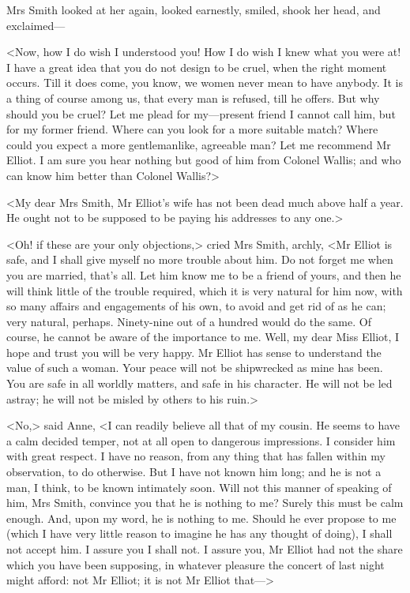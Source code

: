 Mrs Smith looked at her again, looked earnestly, smiled, shook her head, and exclaimed—

<Now, how I do wish I understood you! How I do wish I knew what you were at! I have a great idea that you do not design to be cruel, when the right moment occurs. Till it does come, you know, we women never mean to have anybody. It is a thing of course among us, that every man is refused, till he offers. But why should you be cruel? Let me plead for my—present friend I cannot call him, but for my former friend. Where can you look for a more suitable match? Where could you expect a more gentlemanlike, agreeable man? Let me recommend Mr Elliot. I am sure you hear nothing but good of him from Colonel Wallis; and who can know him better than Colonel Wallis?>

<My dear Mrs Smith, Mr Elliot's wife has not been dead much above half a year. He ought not to be supposed to be paying his addresses to any one.>

<Oh! if these are your only objections,> cried Mrs Smith, archly, <Mr Elliot is safe, and I shall give myself no more trouble about him. Do not forget me when you are married, that's all. Let him know me to be a friend of yours, and then he will think little of the trouble required, which it is very natural for him now, with so many affairs and engagements of his own, to avoid and get rid of as he can; very natural, perhaps. Ninety-nine out of a hundred would do the same. Of course, he cannot be aware of the importance to me. Well, my dear Miss Elliot, I hope and trust you will be very happy. Mr Elliot has sense to understand the value of such a woman. Your peace will not be shipwrecked as mine has been. You are safe in all worldly matters, and safe in his character. He will not be led astray; he will not be misled by others to his ruin.>

<No,> said Anne, <I can readily believe all that of my cousin. He seems to have a calm decided temper, not at all open to dangerous impressions. I consider him with great respect. I have no reason, from any thing that has fallen within my observation, to do otherwise. But I have not known him long; and he is not a man, I think, to be known intimately soon. Will not this manner of speaking of him, Mrs Smith, convince you that he is nothing to me? Surely this must be calm enough. And, upon my word, he is nothing to me. Should he ever propose to me (which I have very little reason to imagine he has any thought of doing), I shall not accept him. I assure you I shall not. I assure you, Mr Elliot had not the share which you have been supposing, in whatever pleasure the concert of last night might afford: not Mr Elliot; it is not Mr Elliot that—>

